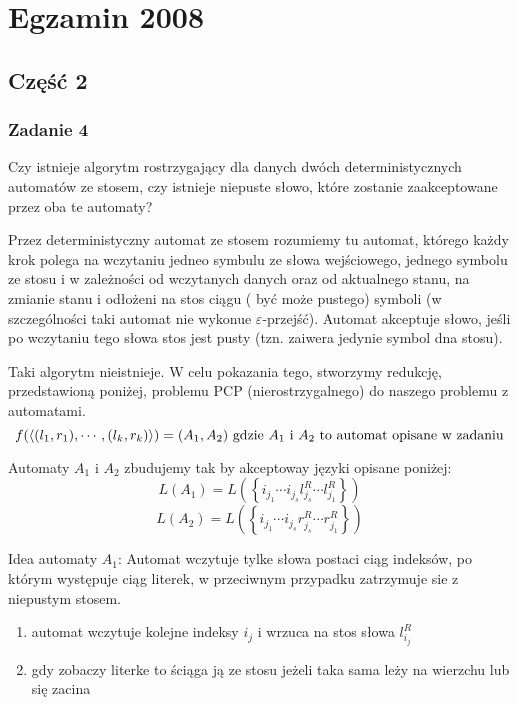 \documentclass[svgnames]{report}
\begin{document}
\tableofcontents

\chapter{Egzamin 2008}
\section{Część 2}
\subsection{Zadanie 4}
\begin{framed}
Czy istnieje algorytm rostrzygający dla danych dwóch deterministycznych automatów ze stosem, czy istnieje niepuste słowo, które zostanie zaakceptowane przez oba te automaty?

Przez deterministyczny automat ze stosem rozumiemy tu automat, którego każdy krok polega na wczytaniu jedneo symbulu ze słowa wejściowego, jednego symbolu ze stosu i w zależności od wczytanych danych oraz od aktualnego stanu, na zmianie stanu i odłożeni na stos ciągu ( być może pustego) symboli (w szczególności taki automat nie wykonue $\varepsilon$-przejść). Automat akceptuje słowo, jeśli po wczytaniu tego słowa stos jest pusty (tzn. zaiwera jedynie symbol dna stosu).
\end{framed}

Taki algorytm nieistnieje.
W celu pokazania tego, stworzymy redukcję, przedstawioną poniżej, problemu PCP (nierostrzygalnego) do naszego problemu z automatami.
\begin{equation}
f(\left<(l_1, r_1), \cdots, (l_k, r_k)\right>) = (A_1, A_2) \ \hbox{gdzie $A_1$ i $A_2$ to automat opisane w zadaniu}
\end{equation}

Automaty $A_1$ i $A_2$ zbudujemy tak by akceptoway języki opisane poniżej:
\begin{equation}
L(A_1) = L(\left\{ i_{j_1} \cdots i_{j_s} l^R_{j_s} \cdots l^R_{j_1}\right\})
\end{equation}
\begin{equation}
L(A_2) = L(\left\{ i_{j_1} \cdots i_{j_s} r^R_{j_s} \cdots r^R_{j_1}\right\})
\end{equation}

Idea automaty $A_1$:
Automat wczytuje tylke słowa postaci ciąg indeksów, po którym występuje ciąg literek, w przeciwnym przypadku zatrzymuje sie z niepustym stosem.
\begin{enumerate}
	\item automat wczytuje kolejne indeksy $i_j$ i wrzuca na stos słowa $l_{i_j}^R$
	\item gdy zobaczy literke to ściąga ją ze stosu jeżeli taka sama leży na wierzchu lub się zacina
\end{enumerate}
\end{document}
